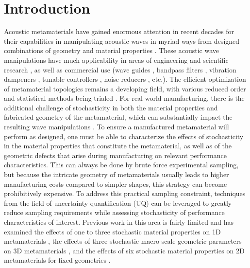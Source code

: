 \documentclass[preprint,review,12pt]{elsarticle}
\begin{document}
\section{Introduction}
\label{introduction}
 Acoustic metamaterials have gained enormous attention in recent decades for their capabilities in manipulating acoustic waves in myriad ways from designed combinations of geometry and material properties \citep{review2020, sal2023sound}. These acoustic wave manipulations have much applicability in areas of engineering and scientific research \cite{liao2021acoustic}, as well as commercial use (wave guides \cite{yang2024computational, liu2020acoustic, zangeneh2018acoustic}, bandpass filters \cite{xinjing2019acoustic, strikwerda2014metamaterial}, vibration dampeners \cite{nakayama2023acoustic, sun2017experimental}, tunable controllers \cite{arretche2023centrifugal, celli2019bandgap, jiao2021wavenumber}, noise reducers \cite{gao2022acoustic}, etc.). The efficient optimization of metamaterial topologies remains a developing field, with  various reduced order and statistical methods being trialed \cite{BENYELUN2023107151, KHAWALE2024107371, ZHU2023107013}. For real world manufacturing, there is the additional challenge \cite{askari2020additive} of stochasticity in both the material properties and fabricated geometry of the metamaterial, which can substantially impact the resulting wave manipulations \cite{gardiner2021additive}. To ensure a manufactured metamaterial will perform as designed, one must be able to characterize the effects of stochasticity in the material properties that constitute the metamaterial, as well as of the geometric defects that arise during manufacturing on relevant performance characteristics. This can always be done by brute force experimental sampling, but because the intricate geometry of metamaterials usually leads to higher manufacturing costs compared to simpler shapes, this strategy can become prohibitively expensive. To address this practical sampling constraint, techniques from the field of uncertainty quantification (UQ) can be leveraged to greatly reduce sampling requirements \cite{shields2015refined, zhang2021modern, LIU2024112716, KAMINSKI2022103648} while assessing stochasticity of performance characteristics of interest. Previous work in this area is fairly limited and has examined the effects of one to three stochastic material properties on 1D metamaterials \cite{nandi2020uncertainty}, the effects of three stochastic macro-scale geometric parameters on 3D metamaterials \cite{henneberg2020periodically}, and the effects of six stochastic material properties on 2D metamaterials for fixed geometries 
\cite{he2018uncertainty}.
\end{document}
